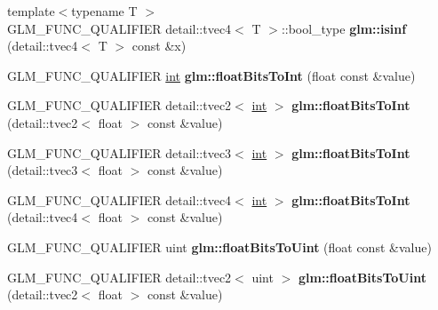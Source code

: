 \begin{DoxyCompactItemize}
\item 
\hypertarget{namespaceglm_ad2670da17fe5420caee266f86c1de00e}{}{\footnotesize template$<$typename T $>$ }\\G\+L\+M\+\_\+\+F\+U\+N\+C\+\_\+\+Q\+U\+A\+L\+I\+F\+I\+E\+R detail\+::tvec4$<$ T $>$\+::bool\+\_\+type {\bfseries glm\+::isinf} (detail\+::tvec4$<$ T $>$ const \&x)\label{namespaceglm_ad2670da17fe5420caee266f86c1de00e}

\item 
\hypertarget{namespaceglm_a9d47b5d53fd4686a4f6e94bfd13d8b87}{}G\+L\+M\+\_\+\+F\+U\+N\+C\+\_\+\+Q\+U\+A\+L\+I\+F\+I\+E\+R \hyperlink{_s_d_l__thread_8h_a6a64f9be4433e4de6e2f2f548cf3c08e}{int} {\bfseries glm\+::float\+Bits\+To\+Int} (float const \&value)\label{namespaceglm_a9d47b5d53fd4686a4f6e94bfd13d8b87}

\item 
\hypertarget{namespaceglm_a1786fff7a5ce08d23d41c3ce0c3bb3da}{}G\+L\+M\+\_\+\+F\+U\+N\+C\+\_\+\+Q\+U\+A\+L\+I\+F\+I\+E\+R detail\+::tvec2$<$ \hyperlink{_s_d_l__thread_8h_a6a64f9be4433e4de6e2f2f548cf3c08e}{int} $>$ {\bfseries glm\+::float\+Bits\+To\+Int} (detail\+::tvec2$<$ float $>$ const \&value)\label{namespaceglm_a1786fff7a5ce08d23d41c3ce0c3bb3da}

\item 
\hypertarget{namespaceglm_ad15d33ead0f23cc3f30437a6779e4a34}{}G\+L\+M\+\_\+\+F\+U\+N\+C\+\_\+\+Q\+U\+A\+L\+I\+F\+I\+E\+R detail\+::tvec3$<$ \hyperlink{_s_d_l__thread_8h_a6a64f9be4433e4de6e2f2f548cf3c08e}{int} $>$ {\bfseries glm\+::float\+Bits\+To\+Int} (detail\+::tvec3$<$ float $>$ const \&value)\label{namespaceglm_ad15d33ead0f23cc3f30437a6779e4a34}

\item 
\hypertarget{namespaceglm_a4e90abc22816cc552c342224dfe5bc1b}{}G\+L\+M\+\_\+\+F\+U\+N\+C\+\_\+\+Q\+U\+A\+L\+I\+F\+I\+E\+R detail\+::tvec4$<$ \hyperlink{_s_d_l__thread_8h_a6a64f9be4433e4de6e2f2f548cf3c08e}{int} $>$ {\bfseries glm\+::float\+Bits\+To\+Int} (detail\+::tvec4$<$ float $>$ const \&value)\label{namespaceglm_a4e90abc22816cc552c342224dfe5bc1b}

\item 
\hypertarget{namespaceglm_af4b02db577db5f494b887e5fab3159c9}{}G\+L\+M\+\_\+\+F\+U\+N\+C\+\_\+\+Q\+U\+A\+L\+I\+F\+I\+E\+R uint {\bfseries glm\+::float\+Bits\+To\+Uint} (float const \&value)\label{namespaceglm_af4b02db577db5f494b887e5fab3159c9}

\item 
\hypertarget{namespaceglm_aa26d288b80921dccfba14f1f87c69dc9}{}G\+L\+M\+\_\+\+F\+U\+N\+C\+\_\+\+Q\+U\+A\+L\+I\+F\+I\+E\+R detail\+::tvec2$<$ uint $>$ {\bfseries glm\+::float\+Bits\+To\+Uint} (detail\+::tvec2$<$ float $>$ const \&value)\label{namespaceglm_aa26d288b80921dccfba14f1f87c69dc9}


\end{DoxyCompactItemize}
